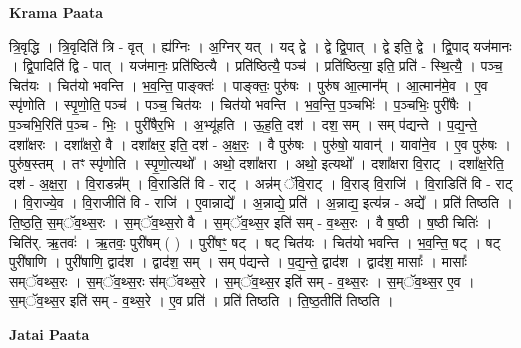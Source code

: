 \documentclass[17pt]{extarticle}
\begin{document}
\textbf{Krama Paata} \newline

त्रि॒वृद्धि । त्रि॒वृदिति॑ त्रि - वृत् । ह्य॑ग्निः । अ॒ग्निर् यत् । यद् द्वे । द्वे द्वि॒पात् । द्वे इति॒ द्वे । द्वि॒पाद् यज॑मानः । द्वि॒पादिति॑ द्वि - पात् । यज॑मानः॒ प्रति॑ष्ठित्यै । प्रति॑ष्ठित्यै॒ पञ्च॑ । प्रति॑ष्ठित्या॒ इति॒ प्रति॑ - स्थि॒त्यै॒ । पञ्च॒ चित॑यः । चित॑यो भवन्ति । भ॒व॒न्ति॒ पाङ्क्तः॑ । पाङ्क्तः॒ पुरु॑षः । पुरु॑ष आ॒त्मान᳚म् । आ॒त्मान॑मे॒व । ए॒व स्पृ॑णोति । स्पृ॒णो॒ति॒ पञ्च॑ । पञ्च॒ चित॑यः । चित॑यो भवन्ति । भ॒व॒न्ति॒ प॒ञ्चभिः॑ । प॒ञ्चभिः॒ पुरी॑षैः । प॒ञ्चभि॒रिति॑ प॒ञ्च - भिः॒ । पुरी॑षैर॒भि । अ॒भ्यू॑हति । ऊ॒ह॒ति॒ दश॑ । दश॒ सम् । सम् प॑द्यन्ते । प॒द्य॒न्ते॒ दशा᳚क्षरः । दशा᳚क्षरो॒ वै । दशा᳚क्षर॒ इति॒ दश॑ - अ॒क्ष॒रः॒ । वै पुरु॑षः । पुरु॑षो॒ यावान्॑ । यावा॑ने॒व । ए॒व पुरु॑षः । पुरु॑ष॒स्तम् । तꣳ स्पृ॑णोति । स्पृ॒णो॒त्यथो᳚ । अथो॒ दशा᳚क्षरा । अथो॒ इत्यथो᳚ । दशा᳚क्षरा वि॒राट् । दशा᳚क्ष॒रेति॒ दश॑ - अ॒क्ष॒रा॒ । वि॒राडन्न᳚म् । वि॒राडिति॑ वि - राट् । अन्न॑म् ॅवि॒राट् । वि॒राड् वि॒राजि॑ । वि॒राडिति॑ वि - राट् । वि॒राज्ये॒व । वि॒राजीति॑ वि - राजि॑ । ए॒वान्नाद्ये᳚ । अ॒न्नाद्ये॒ प्रति॑ । अ॒न्नाद्य॒ इत्य॑न्न - अद्ये᳚ । प्रति॑ तिष्ठति । ति॒ष्ठ॒ति॒ स॒म्ॅव॒थ्स॒रः । स॒म्ॅव॒थ्स॒रो वै । स॒म्ॅव॒थ्स॒र इति॑ सम् - व॒थ्स॒रः । वै ष॒ष्ठी । ष॒ष्ठी चितिः॑ । चिति॑र्. ऋ॒तवः॑ । ऋ॒तवः॒ पुरी॑षम् ( ) । पुरी॑षꣳ॒॒ षट् । षट् चित॑यः । चित॑यो भवन्ति । भ॒व॒न्ति॒ षट् । षट् पुरी॑षाणि । पुरी॑षाणि॒ द्वाद॑श । द्वाद॑श॒ सम् । सम् प॑द्यन्ते । प॒द्य॒न्ते॒ द्वाद॑श । द्वाद॑श॒ मासाः᳚ । मासाः᳚ सम्ॅवथ्स॒रः । स॒म्ॅव॒थ्स॒रः स॑म्ॅवथ्स॒रे । स॒म्ॅव॒थ्स॒र इति॑ सम् - व॒थ्स॒रः । स॒म्ॅव॒थ्स॒र ए॒व । स॒म्ॅव॒थ्स॒र इति॑ सम् - व॒थ्स॒रे । ए॒व प्रति॑ । प्रति॑ तिष्ठति । ति॒ष्ठ॒तीति॑ तिष्ठति । \newline

\textbf{Jatai Paata} \newline
\end{document}
